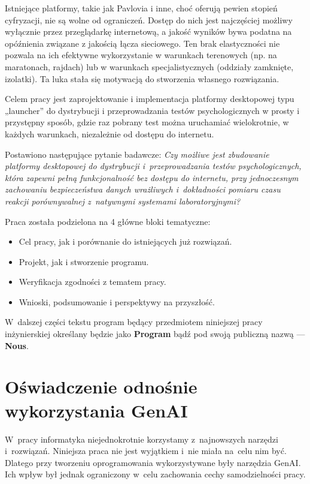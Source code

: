 \documentclass[12pt, a4paper, oneside]{report}
\begin{document}
Istniejące platformy, takie jak Pavlovia i inne, choć oferują pewien stopień cyfryzacji, nie są wolne od ograniczeń. Dostęp do nich jest najczęściej możliwy wyłącznie przez przeglądarkę internetową, a jakość wyników bywa podatna na opóźnienia związane z jakością łącza sieciowego. Ten brak elastyczności nie pozwala na ich efektywne wykorzystanie w warunkach terenowych (np. na maratonach, rajdach) lub w warunkach specjalistycznych (oddziały zamknięte, izolatki). Ta luka stała się motywacją do stworzenia własnego rozwiązania.

Celem pracy jest zaprojektowanie i implementacja platformy desktopowej typu „launcher” do dystrybucji i przeprowadzania testów psychologicznych w prosty i przystępny sposób, gdzie raz pobrany test można uruchamiać wielokrotnie, w każdych warunkach, niezależnie od dostępu do internetu.

Postawiono następujące pytanie badawcze: \textit{Czy możliwe jest zbudowanie platformy desktopowej do dystrybucji i~przeprowadzania testów psychologicznych, która zapewni pełną funkcjonalność bez dostępu do internetu, przy jednoczesnym zachowaniu bezpieczeństwa danych wrażliwych i~dokładności pomiaru czasu reakcji porównywalnej z~natywnymi systemami laboratoryjnymi?}

Praca została podzielona na 4 główne bloki tematyczne:
\begin{itemize}[noitemsep]
	\item Cel pracy, jak i porównanie do istniejących już rozwiązań.
	\item Projekt, jak i stworzenie programu.
	\item Weryfikacja zgodności z tematem pracy.
	\item Wnioski, podsumowanie i perspektywy na przyszłość.
\end{itemize}
W~dalszej części tekstu program będący przedmiotem niniejszej pracy
inżynierskiej określany będzie jako \textbf{Program} bądź pod swoją publiczną
nazwą --- \textbf{Nous}.
\newpage
{}

\section*{Oświadczenie odnośnie wykorzystania GenAI}

W~pracy informatyka niejednokrotnie korzystamy z~najnowszych narzędzi
i~rozwiązań. Niniejsza praca nie jest wyjątkiem i~nie miała na~celu nim być.
Dlatego przy tworzeniu oprogramowania wykorzystywane były narzędzia GenAI.
Ich wpływ był jednak ograniczony w~celu zachowania cechy samodzielności pracy.
\end{document}

